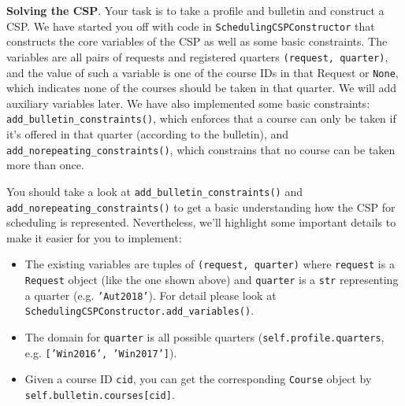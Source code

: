 \documentclass{article}
\theoremstyle{case}
\theoremstyle{definition}
\begin{document}
\textbf{Solving the CSP}. Your task is to take a profile and bulletin and construct a CSP. We have started you off with code in \texttt{SchedulingCSPConstructor} that constructs the core variables of the CSP as well as some basic constraints. The variables are all pairs of requests and registered quarters \texttt{(request, quarter)}, and the value of such a variable is one of the course IDs in that Request or \texttt{None}, which indicates none of the courses should be taken in that quarter. We will add auxiliary variables later. We have also implemented some basic constraints: \texttt{add\_bulletin\_constraints()}, which enforces that a course can only be taken if it's offered in that quarter (according to the bulletin), and \texttt{add\_norepeating\_constraints()}, which constrains that no course can be taken more than once.

You should take a look at \texttt{add\_bulletin\_constraints()} and \texttt{add\_norepeating\_constraints()} to get a basic understanding how the CSP for scheduling is represented. Nevertheless, we'll highlight some important details to make it easier for you to implement:
\begin{itemize}
\item
	The existing variables are tuples of \texttt{(request, quarter)} where \texttt{request} is a \texttt{Request} object (like the one shown above) and \texttt{quarter} is a \texttt{str} representing a quarter (e.g. \texttt{'Aut2018'}). For detail please look at \texttt{SchedulingCSPConstructor.add\_variables()}.
	\item
	The domain for \texttt{quarter} is all possible quarters (\texttt{self.profile.quarters}, e.g. \texttt{['Win2016', 'Win2017']}).
	\item
	Given a course ID \texttt{cid}, you can get the corresponding \texttt{Course} object by \texttt{self.bulletin.courses[cid]}.
	\end{itemize}
\end{document}
